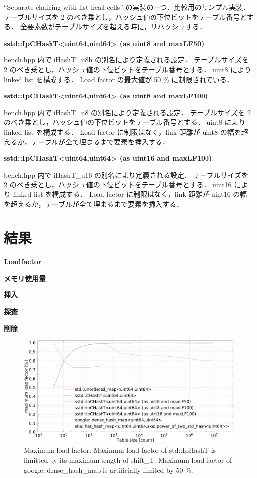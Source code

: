 ``Separate chaining with list head cells'' の実装の一つ．比較用のサンプル実装．
テーブルサイズを 2 のべき乗とし，ハッシュ値の下位ビットをテーブル番号とする．
全要素数がテーブルサイズを超える時に，リハッシュする．
\leavevmode \newline

%
{\bf sstd::IpCHashT<uint64,uint64> (as uint8 and maxLF50)}

{\rm bench.hpp} 内で {\rm iHashT\_u8h} の別名により定義される設定．
テーブルサイズを 2 のべき乗とし，ハッシュ値の下位ビットをテーブル番号とする．
uint8 により linked list を構成する．
Load factor の最大値が 50 \% に制限されている．
\leavevmode \newline

%
{\bf sstd::IpCHashT<uint64,uint64> (as uint8 and maxLF100)}

{\rm bench.hpp} 内で {\rm iHashT\_u8} の別名により定義される設定．
テーブルサイズを 2 のべき乗とし，ハッシュ値の下位ビットをテーブル番号とする．
uint8 により linked list を構成する．
Load factor に制限はなく，link 距離が uint8 の幅を超えるか，テーブルが全て埋まるまで要素を挿入する．
\leavevmode \newline

%
{\bf sstd::IpCHashT<uint64,uint64> (as uint16 and maxLF100)}

{\rm bench.hpp} 内で {\rm iHashT\_u16} の別名により定義される設定．
テーブルサイズを 2 のべき乗とし，ハッシュ値の下位ビットをテーブル番号とする．
uint16 により linked list を構成する．
Load factor に制限はなく，link 距離が uint16 の幅を超えるか，テーブルが全て埋まるまで要素を挿入する．
\leavevmode \newline



\section{結果}

{\bf Loadfactor}

{\bf メモリ使用量}

{\bf 挿入}

{\bf 探査}

{\bf 削除}

\begin{figure}[h]
  \includegraphics[scale=0.24]{./fig_bench/maxLoadFactor_med.pdf}
  \caption{
    Maximum load factor. Maximum load factor of std::IpHashT is limitted by its maximum length of shift\_T.
    Maximum load factor of google::dense\_hash\_map is artificially limited by 50 \%.
  }
  \label{fig_bench_LF}
\end{figure}

